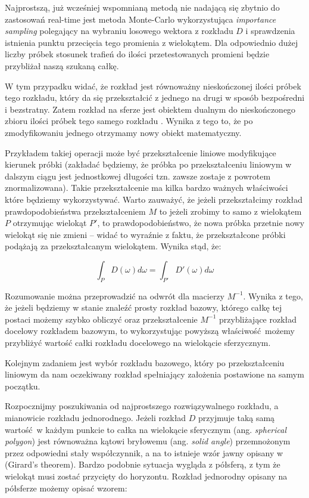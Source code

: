 \documentclass[../main.tex]{subfiles}
\begin{document}
Najprostszą, już wcześniej wspomnianą metodą nie nadającą się zbytnio do
zastosowań real-time jest metoda Monte-Carlo wykorzystująca \textit{importance
sampling} polegający na wybraniu losowego wektora z rozkładu $D$ i sprawdzenia
istnienia punktu przecięcia tego promienia z wielokątem. Dla odpowiednio dużej
liczby próbek stosunek trafień do ilości przetestowanych promieni będzie
przybliżał naszą szukaną całkę.

W tym przypadku widać, że rozkład jest równoważny nieskończonej ilości próbek
tego rozkładu, który da się przekształcić z jednego na drugi w sposób
bezpośredni i bezstratny. Zatem rozkład na sferze jest obiektem dualnym do
nieskończonego zbioru ilości próbek tego samego rozkładu \cite{ltc_heitz}.
Wynika z tego to, że po zmodyfikowaniu jednego otrzymamy nowy obiekt
matematyczny.

Przykładem takiej operacji może być przekształcenie liniowe modyfikujące
kierunek próbki (zakładać będziemy, że próbka po przekształceniu liniowym w
dalszym ciągu jest jednostkowej długości tzn. zawsze zostaje z powrotem
znormalizowana). Takie przekształcenie ma kilka bardzo ważnych właściwości
które będziemy wykorzystywać. Warto zauważyć, że jeżeli przekształcimy rozkład
prawdopodobieństwa przekształceniem $M$ to jeżeli zrobimy to samo z wielokątem
$P$ otrzymując wielokąt $P'$, to prawdopodobieństwo, że nowa próbka przetnie
nowy wielokąt się nie zmieni – widać to wyraźnie z faktu, że przekształcone
próbki podążają za przekształcanym wielokątem. Wynika stąd, że:

$$
\int_P {
  D(\omega)
  d \omega
} = \int_{P'} {
  D'(\omega)
  d\omega
}
$$

Rozumowanie można przeprowadzić na odwrót dla macierzy $M^{-1}$. Wynika z tego,
że jeżeli będziemy w stanie znaleźć prosty rozkład bazowy, którego całkę tej
postaci możemy szybko obliczyć oraz przekształcenie $M^{-1}$ przybliżające
rozkład docelowy rozkładem bazowym, to wykorzystując powyższą właściwość możemy
przybliżyć wartość całki rozkładu docelowego na wielokącie sferzycznym.

\begin{figure}[ht]
\end{figure}

Kolejnym zadaniem jest wybór rozkładu bazowego, który po przekształceniu
liniowym da nam oczekiwany rozkład spełniający założenia postawione na
samym początku.

Rozpocznijmy poszukiwania od najprostszego rozwiązywalnego rozkładu, a
mianowicie rozkładu jednorodnego. Jeżeli rozkład $D$ przyjmuje taką samą
wartość w każdym punkcie to całka na wielokącie sferycznym (ang.
\textit{spherical polygon}) jest równoważna kątowi bryłowemu (ang.
\textit{solid angle}) przemnożonym przez odpowiedni stały współczynnik, a na to
istnieje wzór jawny opisany w \cite{Arvo} \cite{Snyder} (Girard's theorem).
Bardzo podobnie sytuacja wygląda z półsferą, z tym że wielokąt musi zostać
przycięty do horyzontu. Rozkład jednorodny opisany na półsferze możemy opisać
wzorem:
\end{document}
